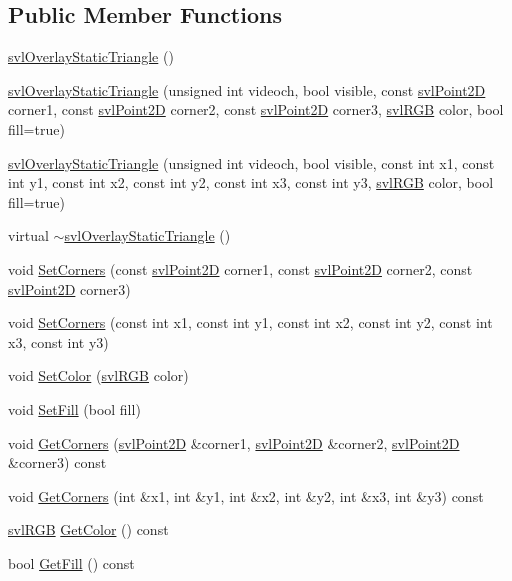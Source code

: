 \subsection*{Public Member Functions}
\begin{DoxyCompactItemize}
\item 
\hyperlink{classsvl_overlay_static_triangle_aeef71400c32c7425aab39bc72dbd73c7}{svl\+Overlay\+Static\+Triangle} ()
\item 
\hyperlink{classsvl_overlay_static_triangle_af950ba95e53e7efb89d738047713e427}{svl\+Overlay\+Static\+Triangle} (unsigned int videoch, bool visible, const \hyperlink{structsvl_point2_d}{svl\+Point2\+D} corner1, const \hyperlink{structsvl_point2_d}{svl\+Point2\+D} corner2, const \hyperlink{structsvl_point2_d}{svl\+Point2\+D} corner3, \hyperlink{structsvl_r_g_b}{svl\+R\+G\+B} color, bool fill=true)
\item 
\hyperlink{classsvl_overlay_static_triangle_a7596d394c84ee618e0821170a10a5af5}{svl\+Overlay\+Static\+Triangle} (unsigned int videoch, bool visible, const int x1, const int y1, const int x2, const int y2, const int x3, const int y3, \hyperlink{structsvl_r_g_b}{svl\+R\+G\+B} color, bool fill=true)
\item 
virtual \hyperlink{classsvl_overlay_static_triangle_abf0cabf4e1b95e41048d739e8b4e832e}{$\sim$svl\+Overlay\+Static\+Triangle} ()
\item 
void \hyperlink{classsvl_overlay_static_triangle_a64abc036b99c654c43b985a864bf5313}{Set\+Corners} (const \hyperlink{structsvl_point2_d}{svl\+Point2\+D} corner1, const \hyperlink{structsvl_point2_d}{svl\+Point2\+D} corner2, const \hyperlink{structsvl_point2_d}{svl\+Point2\+D} corner3)
\item 
void \hyperlink{classsvl_overlay_static_triangle_a4486b9d0c9b260cd20fd3c4fc44e0d48}{Set\+Corners} (const int x1, const int y1, const int x2, const int y2, const int x3, const int y3)
\item 
void \hyperlink{classsvl_overlay_static_triangle_a0f727ad318e2389a116511e89bf2c7e1}{Set\+Color} (\hyperlink{structsvl_r_g_b}{svl\+R\+G\+B} color)
\item 
void \hyperlink{classsvl_overlay_static_triangle_a96a642220b6a0be454e87d090096ee28}{Set\+Fill} (bool fill)
\item 
void \hyperlink{classsvl_overlay_static_triangle_a5b57c22438c1d82c85c5ddc8423e9d7a}{Get\+Corners} (\hyperlink{structsvl_point2_d}{svl\+Point2\+D} \&corner1, \hyperlink{structsvl_point2_d}{svl\+Point2\+D} \&corner2, \hyperlink{structsvl_point2_d}{svl\+Point2\+D} \&corner3) const 
\item 
void \hyperlink{classsvl_overlay_static_triangle_a274383239710564927c70b1af0d5eade}{Get\+Corners} (int \&x1, int \&y1, int \&x2, int \&y2, int \&x3, int \&y3) const 
\item 
\hyperlink{structsvl_r_g_b}{svl\+R\+G\+B} \hyperlink{classsvl_overlay_static_triangle_a005014f748d8d3d158eef90b6590ce7b}{Get\+Color} () const 
\item 
bool \hyperlink{classsvl_overlay_static_triangle_aa5f1cbd383d679917f7b4913fc71feb4}{Get\+Fill} () const 
\end{DoxyCompactItemize}
